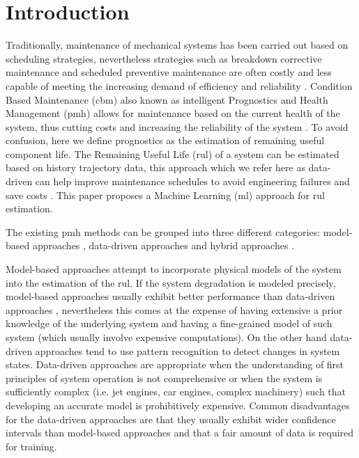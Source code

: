 \section{Introduction}

Traditionally, maintenance of mechanical systems has been carried out based on scheduling strategies, nevertheless strategies such as breakdown corrective maintenance and scheduled preventive maintenance are often costly and less capable of meeting the increasing demand of efficiency and reliability \cite{gebraeel_2005, zaidan_2013}. Condition Based Maintenance (\gls{cbm}) also known as intelligent Prognostics and Health Management (\gls{pmh}) allows for maintenance based on the current health of the system, thus cutting costs and increasing the reliability of the system \cite{zhao_2017}. To avoid confusion, here we define prognostics as the estimation of remaining useful component life. The Remaining Useful Life (\gls{rul}) of a system can be estimated based on history trajectory data, this approach which we refer here as data-driven can help improve maintenance schedules to avoid engineering failures and save costs \cite{lee_2014}. This paper proposes a Machine Learning (\gls{ml}) approach for \gls{rul} estimation.

The existing \gls{pmh} methods can be grouped into three different categories: model-based approaches \cite{yu_2001} , data-driven approaches \cite{liu_2009, mosallam_2013} and hybrid approaches \cite{pecht_2010, liu_2012}.

Model-based approaches attempt to incorporate physical models of the system into the estimation of the \gls{rul}. If the system degradation is modeled  precisely, model-based approaches usually exhibit better performance than data-driven approaches \cite{qian_2017}, nevertheless this comes at the expense of having extensive a prior knowledge of the underlying system and having a fine-grained model of such system (which usually involve expensive computations). On the other hand data-driven approaches tend to use pattern recognition to detect changes in system states. Data-driven approaches are appropriate when the understanding of first principles of system operation is not comprehensive or when the system is sufficiently complex (i.e. jet engines, car engines, complex machinery) such that developing an accurate model is prohibitively expensive. Common disadvantages for the data-driven approaches are that they usually exhibit wider confidence intervals than model-based approaches and that a fair amount of data is required for training.